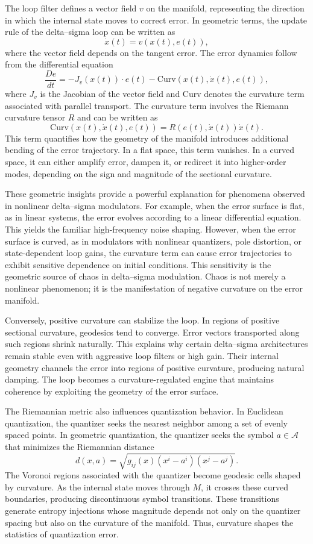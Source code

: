 The loop filter defines a vector field \(v\) on the manifold, representing the direction in which the internal state moves to correct error. In geometric terms, the update rule of the delta–sigma loop can be written as
\[
\dot{x}(t) = v(x(t), e(t)),
\]
where the vector field depends on the tangent error. The error dynamics follow from the differential equation
\[
\frac{D e}{d t} = -J_{v}(x(t)) \cdot e(t) - \mathrm{Curv}(x(t), \dot{x}(t), e(t)),
\]
where \(J_{v}\) is the Jacobian of the vector field and \(\mathrm{Curv}\) denotes the curvature term associated with parallel transport. The curvature term involves the Riemann curvature tensor \(R\) and can be written as
\[
\mathrm{Curv}(x(t), \dot{x}(t), e(t)) = R(e(t), \dot{x}(t))\dot{x}(t).
\]
This term quantifies how the geometry of the manifold introduces additional bending of the error trajectory. In a flat space, this term vanishes. In a curved space, it can either amplify error, dampen it, or redirect it into higher-order modes, depending on the sign and magnitude of the sectional curvature.

These geometric insights provide a powerful explanation for phenomena observed in nonlinear delta–sigma modulators. For example, when the error surface is flat, as in linear systems, the error evolves according to a linear differential equation. This yields the familiar high-frequency noise shaping. However, when the error surface is curved, as in modulators with nonlinear quantizers, pole distortion, or state-dependent loop gains, the curvature term can cause error trajectories to exhibit sensitive dependence on initial conditions. This sensitivity is the geometric source of chaos in delta–sigma modulation. Chaos is not merely a nonlinear phenomenon; it is the manifestation of negative curvature on the error manifold.

Conversely, positive curvature can stabilize the loop. In regions of positive sectional curvature, geodesics tend to converge. Error vectors transported along such regions shrink naturally. This explains why certain delta–sigma architectures remain stable even with aggressive loop filters or high gain. Their internal geometry channels the error into regions of positive curvature, producing natural damping. The loop becomes a curvature-regulated engine that maintains coherence by exploiting the geometry of the error surface.

The Riemannian metric also influences quantization behavior. In Euclidean quantization, the quantizer seeks the nearest neighbor among a set of evenly spaced points. In geometric quantization, the quantizer seeks the symbol \(a \in \mathcal{A}\) that minimizes the Riemannian distance
\[
d(x, a) = \sqrt{g_{ij}(x) (x^{i} - a^{i})(x^{j} - a^{j})}.
\]
The Voronoi regions associated with the quantizer become geodesic cells shaped by curvature. As the internal state moves through \(M\), it crosses these curved boundaries, producing discontinuous symbol transitions. These transitions generate entropy injections whose magnitude depends not only on the quantizer spacing but also on the curvature of the manifold. Thus, curvature shapes the statistics of quantization error.

